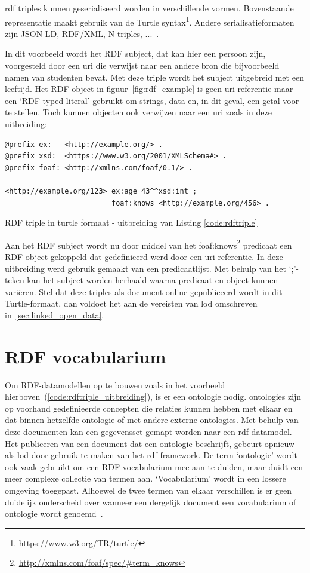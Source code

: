 \acrshort{rdf} triples kunnen geserialiseerd worden in verschillende vormen. Bovenstaande representatie maakt gebruik van de Turtle syntax\footnote{\url{https://www.w3.org/TR/turtle/}}. Andere serialisatieformaten zijn JSON-LD, RDF/XML, N-triples, ...~\cite{publishingLD}.

In dit voorbeeld wordt het RDF subject, dat kan hier een persoon zijn, voorgesteld door een \acrshort{uri} die verwijst naar een andere bron die bijvoorbeeld namen van studenten bevat. Met deze triple wordt het subject uitgebreid met een leeftijd. Het RDF object in figuur~\ref{fig:rdf_example} is geen \acrshort{uri} referentie maar een `RDF typed literal' gebruikt om strings, data en, in dit geval, een getal voor te stellen. Toch kunnen objecten ook verwijzen naar een \acrshort{uri} zoals in deze uitbreiding:

\begin{code}
\begin{verbatim}
@prefix ex:   <http://example.org/> .
@prefix xsd:  <https://www.w3.org/2001/XMLSchema#> .
@prefix foaf: <http://xmlns.com/foaf/0.1/> .

<http://example.org/123> ex:age 43^^xsd:int ;
                         foaf:knows <http://example.org/456> .
\end{verbatim}
\caption{RDF triple in turtle formaat - uitbreiding van Listing \ref{code:rdftriple}}
\label{code:rdftriple_uitbreiding}
\end{code}

Aan het RDF subject wordt nu door middel van het foaf:knows\footnote{\url{http://xmlns.com/foaf/spec/\#term_knows}} predicaat een RDF object gekoppeld dat gedefinieerd werd door een \acrshort{uri} referentie.
In deze uitbreiding werd gebruik gemaakt van een predicaatlijst. Met behulp van het `;'-teken kan het subject worden herhaald waarna predicaat en object kunnen variëren. 
Stel dat deze triples als document online gepubliceerd wordt in dit Turtle-formaat, dan voldoet het aan de vereisten van \acrshort{lod} omschreven in~\ref{sec:linked_open_data}.

\section{RDF vocabularium}
Om RDF-datamodellen op te bouwen zoals in het voorbeeld hierboven~(\ref{code:rdftriple_uitbreiding}), is er een \gls{ontologie} nodig. \Glspl{ontologie} zijn op voorhand gedefinieerde concepten die relaties kunnen hebben met elkaar en dat binnen hetzelfde \gls{ontologie} of met andere externe \glspl{ontologie}. Met behulp van deze documenten kan een gegevensset gemapt worden naar een \acrshort{rdf}-datamodel.
Het publiceren van een document dat een \gls{ontologie} beschrijft, gebeurt opnieuw als \acrshort{lod} door gebruik te maken van het \acrshort{rdf} framework. De term `ontologie' wordt ook vaak gebruikt om een RDF vocabularium mee aan te duiden, maar duidt een meer complexe collectie van termen aan. `Vocabularium' wordt in een lossere omgeving toegepast. Alhoewel de twee termen van elkaar verschillen is er geen duidelijk onderscheid over wanneer een dergelijk document een vocabularium of ontologie wordt genoemd~\cite{ontology}.

